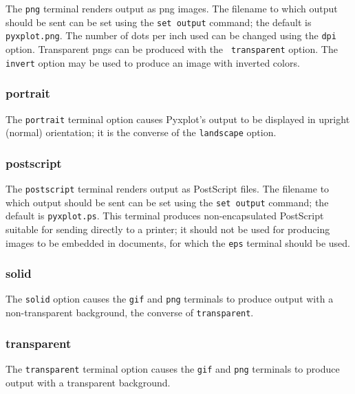 The {\tt png} terminal renders output as png images. The filename to which
output should be sent can be set using the {\tt set output} command; the
default is {\tt pyxplot.png}. The number of dots per inch used can be changed
using the {\tt dpi} option. Transparent pngs can be produced with the {\tt
transparent} option. The {\tt invert} option may be used to produce an image
with inverted colors.


\subsubsection{portrait}

The {\tt portrait} terminal option causes Pyxplot's output to be displayed in
upright (normal) orientation; it is the converse of the {\tt landscape} option.


\subsubsection{postscript}

The {\tt postscript} terminal renders output as PostScript files. The filename
to which output should be sent can be set using the {\tt set output} command;
the default is {\tt pyxplot.ps}.  This terminal produces non-encapsulated
PostScript suitable for sending directly to a printer; it should not be used
for producing images to be embedded in documents, for which the {\tt eps}
terminal should be used.


\subsubsection{solid}

The {\tt solid} option causes the {\tt gif} and {\tt png} terminals to produce
output with a non-transparent background, the converse of {\tt transparent}.


\subsubsection{transparent}

The {\tt transparent} terminal option causes the {\tt gif} and {\tt png}
terminals to produce output with a transparent background.


